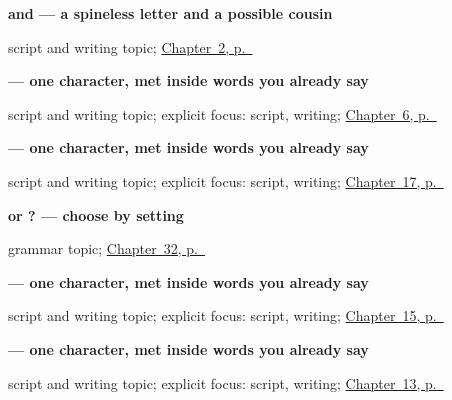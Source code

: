 \noindent\begin{minipage}[t]{\linewidth}
\raggedright
\textbf{ and  — a spineless letter and a possible cousin}\par
\footnotesize script and writing topic; \hyperref[ch:introductions]{Chapter~2, p.~\pageref*{ch:introductions}}
\end{minipage}\par\smallskip

\noindent\begin{minipage}[t]{\linewidth}
\raggedright
\textbf{ — one character, met inside words you already say}\par
\footnotesize script and writing topic; explicit focus: script, writing; \hyperref[ch:hi-numbers-1-5]{Chapter~6, p.~\pageref*{ch:hi-numbers-1-5}}
\end{minipage}\par\smallskip

\noindent\begin{minipage}[t]{\linewidth}
\raggedright
\textbf{ — one character, met inside words you already say}\par
\footnotesize script and writing topic; explicit focus: script, writing; \hyperref[ch:hi-noon-and-midnight]{Chapter~17, p.~\pageref*{ch:hi-noon-and-midnight}}
\end{minipage}\par\smallskip

\noindent\begin{minipage}[t]{\linewidth}
\raggedright
\textbf{  or ? — choose by setting}\par
\footnotesize grammar topic; \hyperref[ch:hi-good-evening]{Chapter~32, p.~\pageref*{ch:hi-good-evening}}
\end{minipage}\par\smallskip

\noindent\begin{minipage}[t]{\linewidth}
\raggedright
\textbf{ — one character, met inside words you already say}\par
\footnotesize script and writing topic; explicit focus: script, writing; \hyperref[ch:hi-water-and-bread]{Chapter~15, p.~\pageref*{ch:hi-water-and-bread}}
\end{minipage}\par\smallskip

\noindent\begin{minipage}[t]{\linewidth}
\raggedright
\textbf{ — one character, met inside words you already say}\par
\footnotesize script and writing topic; explicit focus: script, writing; \hyperref[ch:hi-head-and-hand]{Chapter~13, p.~\pageref*{ch:hi-head-and-hand}}
\end{minipage}\par\smallskip

